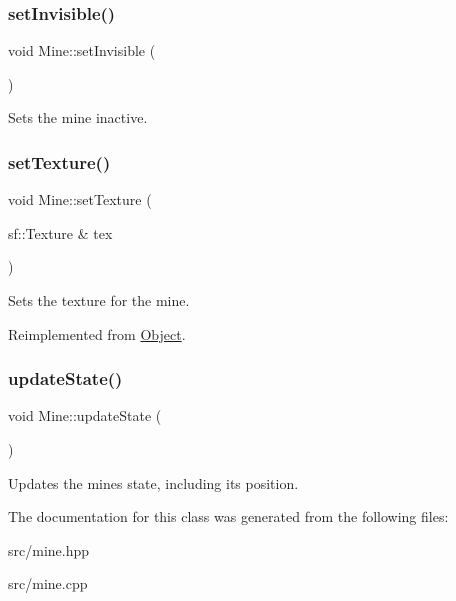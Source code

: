 \subsubsection{\texorpdfstring{set\+Invisible()}{setInvisible()}}
{\footnotesize\ttfamily void Mine\+::set\+Invisible (\begin{DoxyParamCaption}{ }\end{DoxyParamCaption})}

Sets the mine inactive. \hypertarget{classMine_a56c9fa642d918b17cb20a800e66423cb}{}\label{classMine_a56c9fa642d918b17cb20a800e66423cb} 
\subsubsection{\texorpdfstring{set\+Texture()}{setTexture()}}
{\footnotesize\ttfamily void Mine\+::set\+Texture (\begin{DoxyParamCaption}\item[{sf\+::\+Texture \&}]{tex }\end{DoxyParamCaption})\hspace{0.3cm}{\ttfamily [virtual]}}

Sets the texture for the mine. 

Reimplemented from \hyperlink{classObject_a3b23ad400ac8a7133fb470daa4e67467}{Object}.

\hypertarget{classMine_a2bb4b5e254618f4ba26816d6774037ed}{}\label{classMine_a2bb4b5e254618f4ba26816d6774037ed} 
\subsubsection{\texorpdfstring{update\+State()}{updateState()}}
{\footnotesize\ttfamily void Mine\+::update\+State (\begin{DoxyParamCaption}{ }\end{DoxyParamCaption})}

Updates the mine\textquotesingle{}s state, including its position. 

The documentation for this class was generated from the following files\+:\begin{DoxyCompactItemize}
\item 
src/mine.\+hpp\item 
src/mine.\+cpp\end{DoxyCompactItemize}
